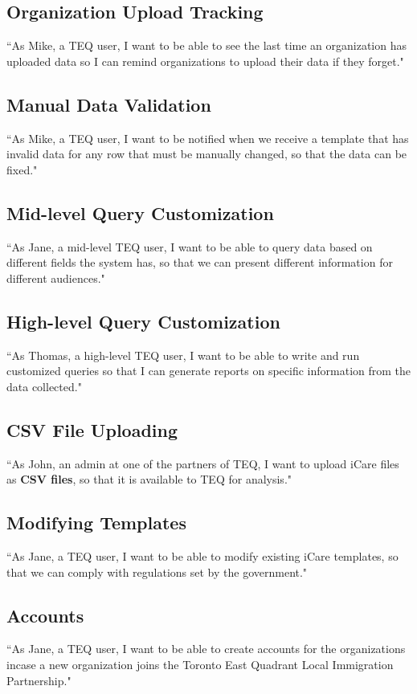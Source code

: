 \documentclass[12pt]{article}
\begin{document}
\subsection{Organization Upload Tracking}
``As Mike, a TEQ user, I want to be able to see the last time an organization has uploaded data so I can remind organizations to upload their data if they forget."

\subsection{Manual Data Validation}
``As Mike, a TEQ user, I want to be notified when we receive a template that has invalid data for any row that must be manually changed, so that the data can be fixed."

\subsection{Mid-level Query Customization}
``As Jane, a mid-level TEQ user, I want to be able to query data based on different fields the system has, so that we can present different information for different audiences."

\subsection{High-level Query Customization}
``As Thomas, a high-level TEQ user, I want to be able to write and run customized queries so that I can generate reports on specific information from the data collected."

\subsection{CSV File Uploading}
``As John, an admin at one of the partners of TEQ, I want to upload iCare files as \textbf{CSV files}, so that it is available to TEQ for analysis."

\subsection{Modifying Templates}
``As Jane, a TEQ user,  I want to be able to modify existing iCare templates, so that we can comply with regulations set by the government."

\subsection{Accounts} ``As Jane, a TEQ user, I want to be able to create accounts for the organizations incase a new organization joins the Toronto East Quadrant Local Immigration Partnership."
\end{document}

